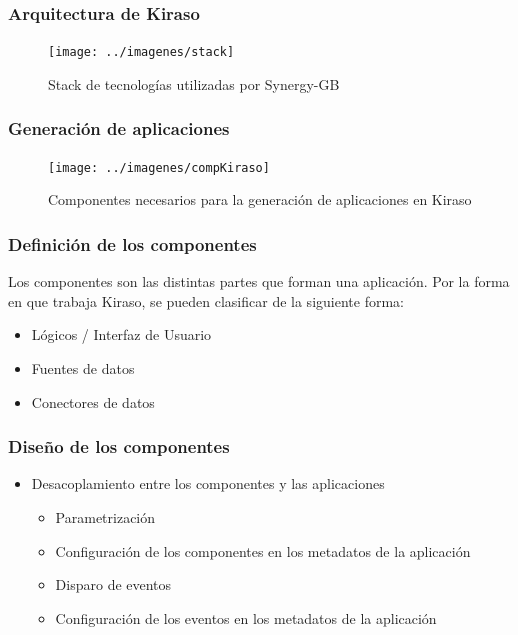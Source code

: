 \documentclass{beamer}
\begin{document}

\begin{frame}[fragile]
\frametitle{Arquitectura de Kiraso}
\begin{figure}[H]
  \texttt{[image: ../imagenes/stack]}
  \caption*{Stack de tecnologías utilizadas por Synergy-GB}
\end{figure}

\end{frame}


\begin{frame}[fragile]
\frametitle{Generación de aplicaciones}
\begin{figure}[H]
  \texttt{[image: ../imagenes/compKiraso]}
  \caption*{Componentes necesarios para la generación de aplicaciones en Kiraso}
\end{figure}

\end{frame}


\begin{frame}[fragile]
\frametitle{Definición de los componentes}

Los componentes son las distintas partes que forman una aplicación. Por la forma en que trabaja Kiraso, se pueden clasificar de la siguiente forma: 

\begin{itemize}
	\item Lógicos / Interfaz de Usuario
	\item Fuentes de datos
	\item Conectores de datos
\end{itemize}

\end{frame}




\begin{frame}[fragile]
\frametitle{Diseño de los componentes}


	\begin{itemize}
		\item Desacoplamiento entre los componentes y las aplicaciones
			\begin{itemize}
				\item Parametrización
				\item Configuración de los componentes en los metadatos de la aplicación
				\item Disparo de eventos
				\item Configuración de los eventos en los metadatos de la aplicación
			\end{itemize}
	\end{itemize}

\end{frame}
\end{document}

